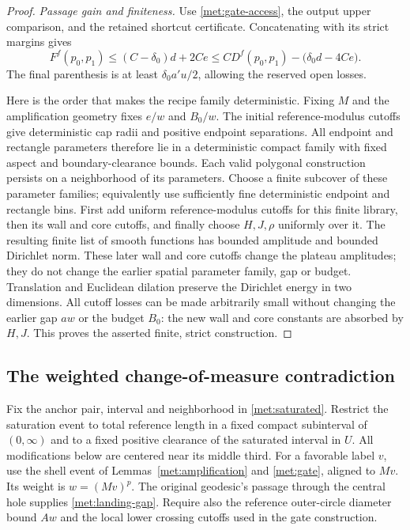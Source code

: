 \documentclass[11pt]{article}
\numberwithin{equation}{section}
\theoremstyle{definition}
\theoremstyle{remark}
\newcommand{\1}{\mathbf 1}
\begin{document}
\begin{proof}
\emph{Passage gain and finiteness.}
Use \eqref{met:gate-access}, the output upper comparison, and the
retained shortcut certificate.  Concatenating with its strict
margins gives
\[
 F^f(p_0,p_1)
 \leq (C-\delta_0)d+2Ce
 \leq C D^f(p_0,p_1)-\bigl(\delta_0d-4Ce\bigr).
\]
The final parenthesis is at least $\delta_0a'u/2$, allowing the
reserved open losses.

Here is the order that makes the recipe family deterministic.  Fixing
$M$ and the amplification geometry fixes $e/w$ and $B_0/w$.  The
initial reference-modulus cutoffs give deterministic cap radii and
positive endpoint separations.  All endpoint and rectangle parameters
therefore lie in a deterministic compact family with fixed aspect and
boundary-clearance bounds.  Each valid polygonal construction persists
on a neighborhood of its parameters.  Choose a finite subcover of these parameter families;
equivalently use sufficiently fine deterministic endpoint and
rectangle bins.  First add uniform reference-modulus cutoffs for this
finite library, then its wall and core cutoffs, and finally choose
$H,J,\rho$ uniformly over it.  The resulting finite list of smooth
functions has bounded amplitude and bounded Dirichlet norm.
These later wall and core cutoffs change the plateau amplitudes; they
do not change the earlier spatial parameter family, gap or budget.
Translation and Euclidean dilation preserve the Dirichlet energy in
two dimensions.  All cutoff losses can be made arbitrarily small
without changing the earlier gap $aw$ or the budget $B_0$: the new
wall and core constants are absorbed by $H,J$.  This proves the
asserted finite, strict construction.
\end{proof}

\subsection{The weighted change-of-measure contradiction}

Fix the anchor pair, interval and neighborhood in
\eqref{met:saturated}.  Restrict the saturation event to total
reference length in a fixed compact subinterval of $(0,\infty)$ and
to a fixed positive clearance of the saturated interval in $U$.
All modifications below are centered near its middle third.  For a
favorable label $v$, use the shell event of
Lemmas~\ref{met:amplification} and \ref{met:gate}, aligned to $Mv$.
Its weight is $w=(Mv)^p$.  The original geodesic's passage through the
central hole supplies \eqref{met:landing-gap}.  Require also the
reference outer-circle diameter bound $Aw$ and the local lower
crossing cutoffs used in the gate construction.
\end{document}
